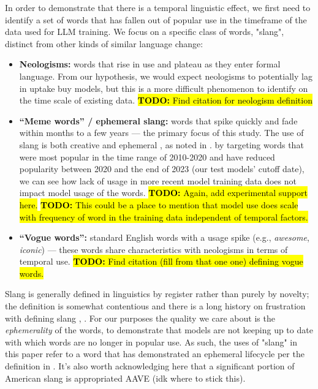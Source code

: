 \documentclass[11pt]{article}
\newcommand{\todo}[1]{\hl{\textbf{TODO:} #1}}
\begin{document}
In order to demonstrate that there is a temporal linguistic effect, we first need to identify a set of words that has fallen out of popular use in the timeframe of the data used for LLM training. We focus on a specific class of words, "slang", distinct from other kinds of similar language change:

\begin{itemize}
  \item \textbf{Neologisms:} words that rise in use and plateau as they
  enter formal language. From our hypothesis, we would expect neologisms to potentially lag in uptake buy models, but this is a more difficult phenomenon to identify on the time scale of existing data. \todo{Find citation for neologism definition}

  \item \textbf{``Meme words'' / ephemeral slang:} words that spike
  quickly and fade within months to a few years --- the primary focus of
  this study. The use of slang is both creative and ephemeral
  \citep{eble1989slang}, as noted in \citet{wu2025slang}. by targeting words that were most popular in the time range of 2010-2020 and have reduced popularity between 2020 and the end of 2023 (our test models' cutoff date), we can see how lack of usage in more recent model training data does not impact model usage of the words. \todo{Again, add experimental support here.}
  \todo{This could be a place to mention that model use does scale with frequency of word in the training data independent of temporal factors.}

  \item \textbf{``Vogue words'':} standard English words with a usage spike (e.g., \textit{awesome}, \textit{iconic}) --- these words share characteristics with neologisms in terms of temporal use.
  \todo{Find citation (fill from that one one) defining vogue words.}
\end{itemize}

Slang is generally defined in linguistics by register rather than purely by novelty; the definition is somewhat contentious and there is a long history on frustration with defining slang \cite{lighter1978slang}, \cite{chapman2010slang}. For our purposes the quality we care about is the \textit{ephemerality} of the words, to demonstrate that models are not keeping up to date with which words are no longer in popular use. As such, the uses of "slang" in this paper refer to a word that has demonstrated an ephemeral lifecycle per the definition in \cite{eble1989slang}. 
It's also worth acknowledging here that a significant portion of American slang is appropriated AAVE (idk where to stick this).
\end{document}
